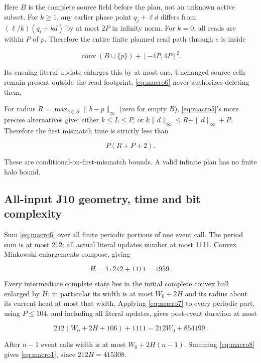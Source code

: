 Here $B$ is the complete source field before the plan, not an unknown active
subset. For $k\ge1$, any earlier phase point $q_j+\ell d$ differs
from $(\ell/k)(q_i+kd)$ by at most $2P$ in infinity norm. For $k=0$, all reads
are within $P$ of $p$. Therefore the entire finite planned read path through
$e$ is inside

\begin{equation}\label{eq:macro6}
\operatorname{conv}(B\cup\{p\})+[-4P,4P]^2.
\end{equation}

Its ensuing literal update enlarges this by at most one. Unchanged
source cells remain present outside the read footprint; \eqref{eq:macro6} never
authorizes deleting them.

For radius $R=\max_{b\in B}\|b-p\|_\infty$ (zero for empty $B$),
\eqref{eq:macro5}'s more precise alternatives give: either
$k\le L\le P$, or
$k\|d\|_\infty\le R+\|d\|_\infty+P$.
Therefore the first mismatch time is strictly less than

\begin{equation}\label{eq:macro7}
P(R+P+2).
\end{equation}

These are conditional-on-first-mismatch bounds. A valid infinite plan
has no finite halo bound.

\subsection{All-input J10 geometry, time and bit
complexity}\label{macro-7}

Sum \eqref{eq:macro6} over all finite periodic portions of one event call. The
period sum is at most 212; all actual literal updates number at most
1111. Convex Minkowski enlargements compose, giving

\[
H=4\cdot212+1111=1959.
\]

Every intermediate complete state lies in the initial complete convex
hull enlarged by $H$; in particular its width is at most $W_0+2H$ and its
radius about its current head at most that width. Applying \eqref{eq:macro7} to
every periodic part, using $P\le104$, and including all literal
updates, gives post-event duration at most

\begin{equation}\label{eq:macro8}
212(W_0+2H+106)+1111=212W_0+854199.
\end{equation}

After $n-1$ event calls width is at most $W_0+2H(n-1)$. Summing \eqref{eq:macro8}
gives \eqref{eq:macro1}, since $212H=415308$.

